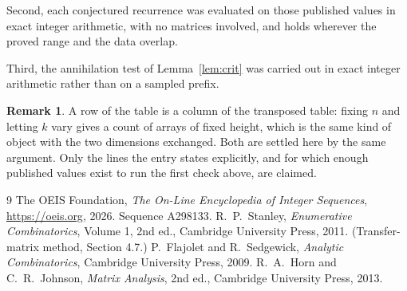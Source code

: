 \documentclass[11pt,a4paper]{article}
\theoremstyle{plain}
\theoremstyle{definition}
\newtheorem{remark}[theorem]{Remark}
\begin{document}
Second, each conjectured recurrence was evaluated on those published values in exact
integer arithmetic, with no matrices involved, and holds wherever the proved range and the
data overlap.

Third, the annihilation test of Lemma~\ref{lem:crit} was carried out in exact integer
arithmetic rather than on a sampled prefix.

\begin{remark}
A row of the table is a column of the transposed table: fixing $n$ and letting $k$ vary gives a
count of arrays of fixed height, which is the same kind of object with the two dimensions
exchanged. Both are settled here by the same argument. Only the lines the entry states
explicitly, and for which enough published values exist to run the first check above, are
claimed.
\end{remark}

\begin{thebibliography}{9}
 The OEIS Foundation, \emph{The On-Line Encyclopedia of Integer
Sequences}, \url{https://oeis.org}, 2026. Sequence A298133.
 R.~P.~Stanley, \emph{Enumerative Combinatorics}, Volume 1, 2nd ed.,
Cambridge University Press, 2011. (Transfer-matrix method, Section 4.7.)
 P.~Flajolet and R.~Sedgewick, \emph{Analytic Combinatorics}, Cambridge
University Press, 2009.
 R.~A.~Horn and C.~R.~Johnson, \emph{Matrix Analysis}, 2nd ed., Cambridge
University Press, 2013.
\end{thebibliography}
\end{document}
